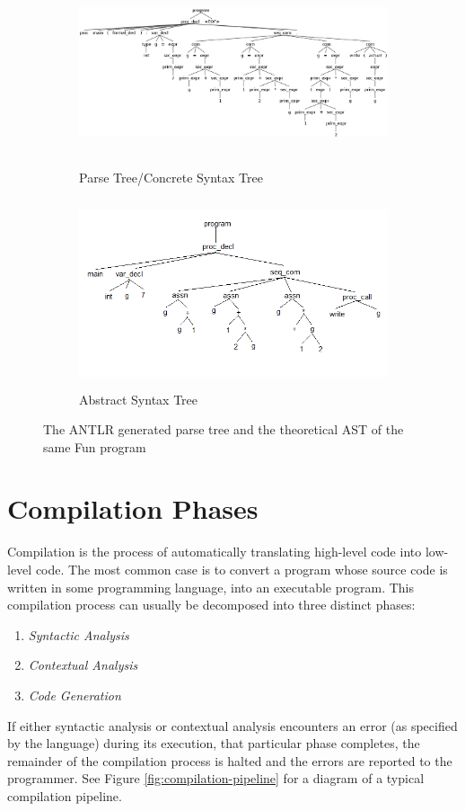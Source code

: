 \documentclass{l4proj}
\begin{document}
\begin{figure}[h]
	\begin{subfigure}[b]{0.5\textwidth}
		\includegraphics[height=5.5cm,width=\linewidth]{images/2-2a.png}
		\caption{Parse Tree/Concrete Syntax Tree}
		\label{fig:ANTLR-parse-tree}
	\end{subfigure}
	\begin{subfigure}[b]{0.5\textwidth}
		\includegraphics[height=5.5cm,width=\linewidth]{images/2-2b.png}
		\caption{Abstract Syntax Tree}
		\label{fig:ANTLR-syntax-tree}
	\end{subfigure}
	\caption{The ANTLR generated parse tree and the theoretical AST of the same Fun program}\label{fig:parse-abstract-tree}	
\end{figure}

\section{Compilation Phases}
Compilation is the process of automatically translating high-level code into low-level code. The most common case is to convert a program whose source code is written in some programming language, into an executable program. This compilation process can usually be decomposed into three distinct phases: 
\begin{enumerate}[label=\alph*)]
\item \textit {Syntactic Analysis}
\item \textit {Contextual Analysis}
\item \textit {Code Generation}
\end{enumerate}
If either syntactic analysis or contextual analysis encounters an error (as specified by the language) during its execution, that particular phase completes, the remainder of the compilation process is halted and the errors are reported to the programmer. See Figure \ref{fig:compilation-pipeline} for a diagram of a typical compilation pipeline.
\end{document}
